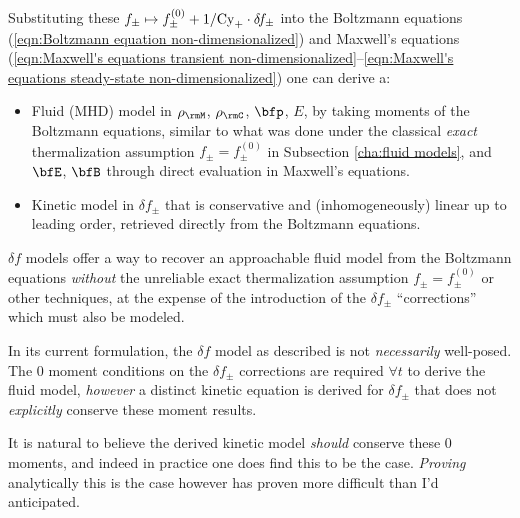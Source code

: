 \begin{definition}
        Substituting these $f_{\pm}  \mapsto  f_{\pm}^{(0)} + 1/\mathrm{Cy}_{+}\cdot\delta\!f_{\pm}$ into the Boltzmann equations (\ref{eqn:Boltzmann equation non-dimensionalized}) and Maxwell's equations (\ref{eqn:Maxwell's equations transient non-dimensionalized}--\ref{eqn:Maxwell's equations steady-state non-dimensionalized}) one can derive a:
        \begin{itemize}
            \item  Fluid (MHD) model in $\rho_{\rmM}$, $\rho_{\rmC}$, $\bfp$, $E$, by taking moments of the Boltzmann equations, similar to what was done under the classical \emph{exact} thermalization assumption $f_{\pm}  =  f_{\pm}^{(0)}$ in Subsection \ref{cha:fluid models}, and $\bfE$, $\bfB$ through direct evaluation in Maxwell's equations.
            \item  Kinetic model in $\delta\!f_{\pm}$ that is conservative and (inhomogeneously) linear up to leading order, retrieved directly from the Boltzmann equations.
        \end{itemize}
    \end{definition}

    $\delta\!f$ models offer a way to recover an approachable fluid model from the Boltzmann equations \emph{without} the unreliable exact thermalization assumption $f_{\pm}  =  f_{\pm}^{(0)}$ or other techniques, at the expense of the introduction of the $\delta\!f_{\pm}$ ``corrections'' which must also be modeled.

    \line

    In its current formulation, the $\delta\!f$ model as described is not \emph{necessarily} well-posed. The 0 moment conditions on the $\delta\!f_{\pm}$ corrections are required $\forall t$ to derive the fluid model, \emph{however} a distinct kinetic equation is derived for $\delta\!f_{\pm}$ that does not \emph{explicitly} conserve these moment results.

    \begin{remark}
        It is natural to believe the derived kinetic model \emph{should} conserve these 0 moments, and indeed in practice one does find this to be the case. \emph{Proving} analytically this is the case however has proven more difficult than I'd anticipated. 
    \end{remark}

